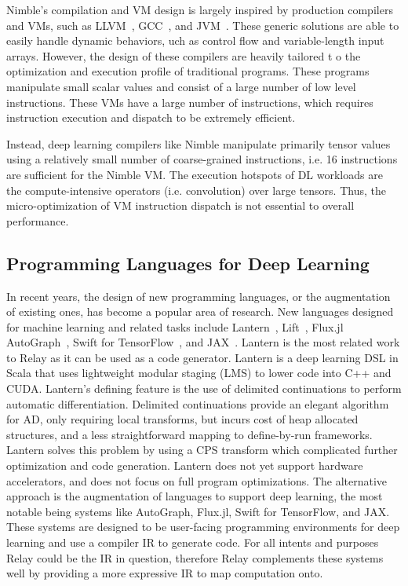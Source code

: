 Nimble's compilation and VM design is largely inspired by production compilers and VMs,
such as LLVM~\citep{llvm}, GCC~\citep{gcc}, and JVM~\citep{jvm}.
These generic solutions are able to easily handle dynamic behaviors,
uch as control flow and variable-length input arrays.
However, the design of these compilers are heavily tailored t
o the optimization and execution profile of traditional programs.
These programs manipulate small scalar values and consist of a large
number of low level instructions. These VMs have a large number of instructions,
which requires instruction execution and dispatch to be extremely efficient.

Instead, deep learning compilers like Nimble manipulate primarily
tensor values using a relatively small number of coarse-grained instructions,
 i.e. 16 instructions are sufficient for the Nimble VM. The execution hotspots
 of DL workloads are the compute-intensive operators (i.e. convolution)
 over large tensors. Thus, the micro-optimization of VM instruction
  dispatch is not essential to overall performance.

\subsection{Programming Languages for Deep Learning}
\label{sec:pl_techniques_in_dl}

In recent years, the design of new programming languages,
    or the augmentation of existing ones, has become
    a popular area of research.
New languages designed for machine learning and related
    tasks include Lantern~\citep{lantern}, Lift~\citep{lift_lang}, Flux.jl~\citep{fluxjl}
    AutoGraph~\citep{moldovan2018autograph}, Swift for TensorFlow~\citep{tf_swift},
    and JAX~\citep{jax}.
Lantern \citep{lantern} is the most related work to Relay as it can
    be used as a code generator.
Lantern is a deep learning DSL in Scala
    that uses lightweight modular staging (LMS) to lower code into C++ and CUDA.
Lantern's defining feature is the use of delimited continuations to perform
    automatic differentiation.
Delimited continuations provide an elegant algorithm for AD,
    only requiring local transforms, but incurs cost of
    heap allocated structures, and a less straightforward
    mapping to define-by-run frameworks.
Lantern solves this problem by using a CPS transform which
    complicated further optimization and code generation.
Lantern does not yet support hardware accelerators, and
    does not focus on full program optimizations.
The alternative approach is the augmentation of languages to support deep learning,
  the most notable being systems like AutoGraph, Flux.jl, Swift for TensorFlow,
  and JAX.
These systems are designed to be user-facing programming
    environments for deep learning and use a compiler IR
    to generate code.
For all intents and purposes Relay could be the IR in
    question, therefore  Relay complements these systems well by
    providing a more expressive IR to map computation onto.

